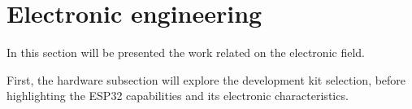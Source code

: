 \newpage
\section{Electronic engineering}
\label{sec:ee}

In this section will be presented the work related on the electronic field.

\medskip First, the hardware subsection will explore the development kit selection, before highlighting the ESP32 capabilities and its electronic characteristics. 
